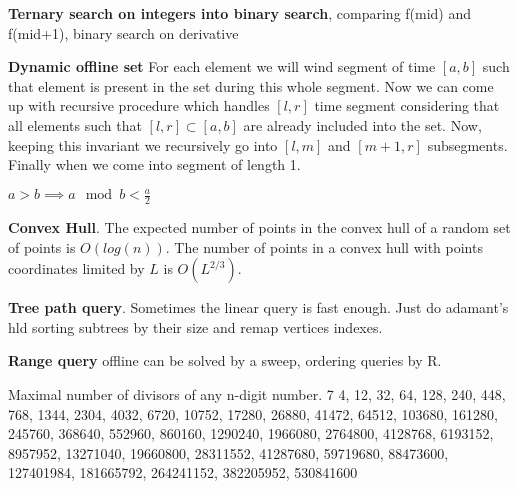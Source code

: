 \documentclass[letterpaper,10pt,oneside,footsepline, landscape]{article}
\begin{document}
\begin{multicols}{3}
\textbf{Ternary search on integers into binary search}, comparing f(mid) and f(mid+1), binary search on derivative

\textbf{Dynamic offline set} For each element we will wind segment of time $[a, b]$ such that element is present in the set during this whole segment. Now we can come up with recursive procedure which handles $[l, r]$ time segment considering that all elements such that $[l, r] \subset [a, b]$ are already included into the set. Now, keeping this invariant we recursively go into $[l, m]$ and $[m+1, r]$ subsegments. Finally when we come into segment of length 1.

$a > b \implies a \mod b < \frac{a}{2}$

\textbf{Convex Hull}. The expected number of points in the convex hull of a random set of points is $O(log(n))$. The number of points in a convex hull with points coordinates limited by $L$ is $O(L^{2/3})$.

\textbf{Tree path query}. Sometimes the linear query is fast enough. Just do adamant's hld sorting subtrees by their size and remap vertices indexes.

\textbf{Range query} offline can be solved by a sweep, ordering queries by R.

Maximal number of divisors of any n-digit number. 7 4, 12, 32, 64, 128, 240, 448, 768, 1344, 2304, 4032, 6720, 10752, 17280, 26880, 41472, 64512, 103680, 161280, 245760, 368640, 552960, 860160, 1290240, 1966080, 2764800, 4128768, 6193152, 8957952, 13271040, 19660800, 28311552, 41287680, 59719680, 88473600, 127401984, 181665792, 264241152, 382205952, 530841600

\end{multicols}
\end{document}
